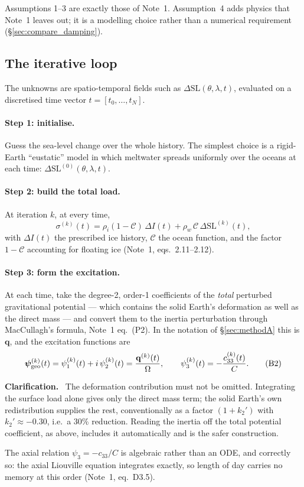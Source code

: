 \documentclass[11pt,a4paper]{article}
\newcommand{\bq}{\mathbf{q}}
\newcommand{\dSL}{\Delta\mathrm{SL}}
\newcommand{\oc}{\mathcal{C}}
\renewenvironment{leftbar}{%
  \def\FrameCommand{{\color{clarbar}\vrule width 2.5pt}\hspace{8pt}}%
  \MakeFramed{\advance\hsize-\width\FrameRestore}}%
  {\endMakeFramed}
\newenvironment{clar}{\begin{leftbar}\small\noindent\textbf{Clarification.}\ }{\end{leftbar}}
\begin{document}
Assumptions 1--3 are exactly those of Note~1. Assumption~4 adds physics that Note~1 leaves out; it is
a modelling choice rather than a numerical requirement (\S\ref{sec:compare_damping}).

\subsection{The iterative loop}

The unknowns are spatio-temporal fields such as $\dSL(\theta,\lambda,t)$, evaluated on a discretised
time vector $t=[t_0,\dots,t_N]$.

\paragraph{Step 1: initialise.} Guess the sea-level change over the whole history. The simplest
choice is a rigid-Earth ``eustatic'' model in which meltwater spreads uniformly over the oceans at
each time: $\dSL^{(0)}(\theta,\lambda,t)$.

\paragraph{Step 2: build the total load.} At iteration $k$, at every time,
\begin{equation}
  \sigma^{(k)}(t)=\rho_i(1-\oc)\,\Delta I(t)+\rho_w\,\oc\,\dSL^{(k)}(t),
  \tag{B1}\label{b1}
\end{equation}
with $\Delta I(t)$ the prescribed ice history, $\oc$ the ocean function, and the factor $1-\oc$
accounting for floating ice (Note~1, eqs.~2.11--2.12).

\paragraph{Step 3: form the excitation.} At each time, take the degree-2, order-1 coefficients of the
\emph{total} perturbed gravitational potential --- which contains the solid Earth's deformation as
well as the direct mass --- and convert them to the inertia perturbation through MacCullagh's
formula, Note~1 eq.~(P2). In the notation of \S\ref{sec:methodA} this is $\bq$, and the excitation
functions are
\begin{equation}
  \bm\psi^{(k)}_{\rm geo}(t)=\psi^{(k)}_1(t)+i\,\psi^{(k)}_2(t)=\frac{\bq^{(k)}(t)}{\Omega},
  \qquad
  \psi^{(k)}_3(t)=-\frac{c^{(k)}_{33}(t)}{C}.
  \tag{B2}\label{b2}
\end{equation}

\begin{clar}
The deformation contribution must not be omitted. Integrating the surface load alone gives only the
direct mass term; the solid Earth's own redistribution supplies the rest, conventionally as a factor
$(1+k_2')$ with $k_2'\approx-0.30$, i.e.\ a 30\% reduction. Reading the inertia off the total
potential coefficient, as above, includes it automatically and is the safer construction.

The axial relation $\psi_3=-c_{33}/C$ is algebraic rather than an ODE, and correctly so: the axial
Liouville equation integrates exactly, so length of day carries no memory at this order (Note~1,
eq.~D3.5).
\end{clar}
\end{document}
